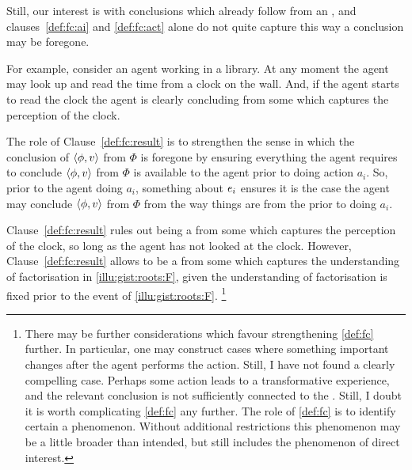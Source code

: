 \begin{note}
  Still, our interest is with conclusions which already follow from an \agpe{}, and clauses~\ref{def:fc:ai} and \ref{def:fc:act} alone do not quite capture this way a conclusion may be foregone.

  For example, consider an agent working in a library.
  At any moment the agent may look up and read the time from a clock on the wall.
  And, if the agent starts to read the clock the agent is clearly concluding  from some \pool{} which captures the \agents{} perception of the clock.

  The role of Clause~\ref{def:fc:result} is to strengthen the sense in which the conclusion of \(\langle\phi, v\rangle\) from \(\Phi\) is foregone by ensuring everything the agent requires to conclude \(\langle\phi, v\rangle\) from \(\Phi\) is available to the agent prior to doing action \(a_{i}\).
  So, prior to the agent doing \(a_{i}\), something about \(e\sb{i}\) ensures it is the case the agent may conclude \(\langle\phi, v\rangle\) from \(\Phi\) from the way things are from the \agpe{} prior to doing \(a_{i}\).

  Clause~\ref{def:fc:result} rules out  being a \fc{} from some \pool{} which captures the \agents{} perception of the clock, so long as the agent has not looked at the clock.
  However, Clause~\ref{def:fc:result} allows  to be a \fc{} from some \pool{} which captures the \agents{} understanding of factorisation in \autoref{illu:gist:roots:F}, given the \agents{} understanding of factorisation is fixed prior to the event of \autoref{illu:gist:roots:F}.%
  \footnote{
    There may be further considerations which favour strengthening \autoref{def:fc} further.
    In particular, one may construct cases where something important changes after the agent performs the action.
    Still, I have not found a clearly compelling case.
    Perhaps some action leads to a transformative experience, and the relevant conclusion is not sufficiently connected to the .
    Still, I doubt it is worth complicating \autoref{def:fc} any further.
    The role of \autoref{def:fc} is to identify certain a phenomenon.
    Without additional restrictions this phenomenon may be a little broader than intended, but still includes the phenomenon of direct interest.
  }
\end{note}

